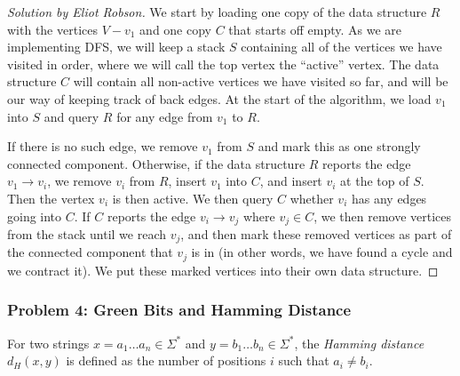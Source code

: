 \documentclass{article}
\newenvironment{solution}[1]{\begin{proof}[Solution by #1]}{\end{proof}}
\begin{document}
\begin{enumerate}
\begin{solution}{Eliot Robson}
        We start by loading one copy of the data structure \(R\) with the vertices \(V - v_1\) and one copy \(C\) that starts off empty. As we are implementing DFS, we will keep a stack \(S\) containing all of the vertices we have visited in order, where we will call the top vertex the ``active'' vertex. The data structure \(C\) will contain all non-active vertices we have visited so far, and will be our way of keeping track of back edges. At the start of the algorithm, we load \(v_1\) into \(S\) and query \(R\) for any edge from \(v_1\) to \(R\).
        
        If there is no such edge, we remove \(v_1\) from \(S\) and mark this as one strongly connected component. Otherwise, if the data structure \(R\) reports the edge \(v_1 \to v_i\), we remove \(v_i\) from \(R\), insert \(v_1\) into \(C\), and insert \(v_i\) at the top of \(S\). Then the vertex \(v_i\) is then active. We then query \(C\) whether \(v_i\) has any edges going into \(C\). If \(C\) reports the edge \(v_i \to v_j\) where \(v_j \in C\), we then remove vertices from the stack until we reach \(v_j\), and then mark these removed vertices as part of the connected component that \(v_j\) is in (in other words, we have found a cycle and we contract it). We put these marked vertices into their own data structure. 
        
    \end{solution}
\end{enumerate}

\subsubsection{Problem 4: Green Bits and Hamming Distance}
For two strings \(x = a_1 \dots a_n \in \Sigma^*\) and \(y = b_1 \dots b_n \in \Sigma^*\), the \emph{Hamming distance} \(d_H (x,y)\) is defined as the number of positions \(i\) such that \(a_i \neq b_i\).
\end{document}
